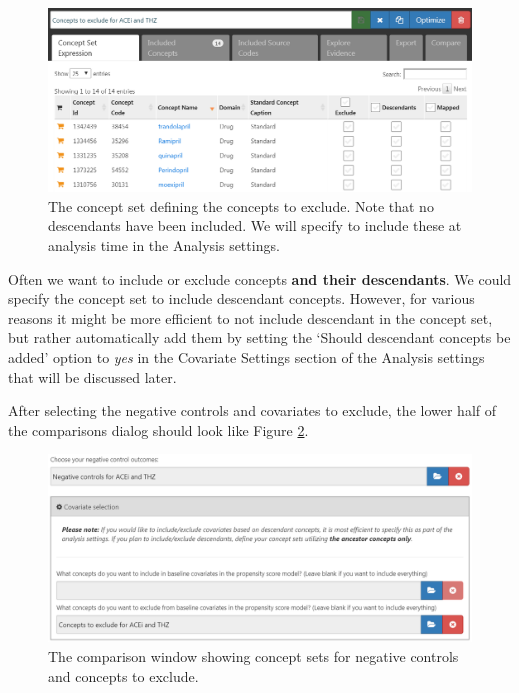 \documentclass[11pt]{book}
\begin{document}
\begin{figure}

{\centering \includegraphics[width=1\linewidth]{images/PopulationLevelEstimation/covsToExclude} 

}

\caption{The concept set defining the concepts to exclude. Note that no descendants have been included. We will specify to include these at analysis time in the Analysis settings.}\label{fig:covsToExclude}
\end{figure}

Often we want to include or exclude concepts \textbf{and their
descendants}. We could specify the concept set to include descendant
concepts. However, for various reasons it might be more efficient to not
include descendant in the concept set, but rather automatically add them
by setting the `Should descendant concepts be added' option to
\emph{yes} in the Covariate Settings section of the Analysis settings
that will be discussed later.

After selecting the negative controls and covariates to exclude, the
lower half of the comparisons dialog should look like Figure
\ref{fig:comparisons2}.

\begin{figure}

{\centering \includegraphics[width=1\linewidth]{images/PopulationLevelEstimation/comparisons2} 

}

\caption{The comparison window showing concept sets for negative controls and concepts to exclude.}\label{fig:comparisons2}
\end{figure}
\end{document}
